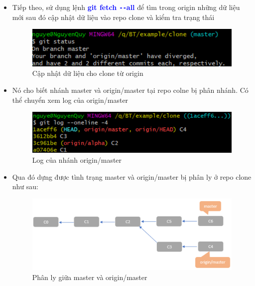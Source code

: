 \documentclass[12pt,a4paper]{report}
\begin{document}
\begin{itemize}
\item Tiếp theo, sử dụng lệnh \textcolor{blue}{\bf git fetch \texttt{-{}-}all} để  tìm trong origin những dữ liệu mới sau đó cập nhật dữ liệu vào repo clone và kiểm tra trạng thái

\begin{figure}[!ht]
	\centering
 	\includegraphics[width=0.8\linewidth]{screenshot073}
 \caption{Cập nhật dữ liệu cho clone từ origin}
 	\label{fig:screenshot073}
 	\end{figure}

\item Nó cho biết nhánh master và origin/master tại repo colne bị phân nhánh. Có thể chuyển xem log của origin/master

\begin{figure}[!ht]
	\centering
 	\includegraphics[width=0.8\linewidth]{screenshot074}
 \caption{Log của nhánh origin/master}
 	\label{fig:screenshot074}
\end{figure}

\item Qua đó dựng được tình trạng master và origin/master bị phân ly ở repo clone như sau:

\begin{figure}[!ht]
	\centering
 	\includegraphics[width=0.8\linewidth]{screenshot075}
 \caption{Phân ly giữa master và origin/master}
 	\label{fig:screenshot075}
 	\end{figure}
\end{itemize}
\end{document}
